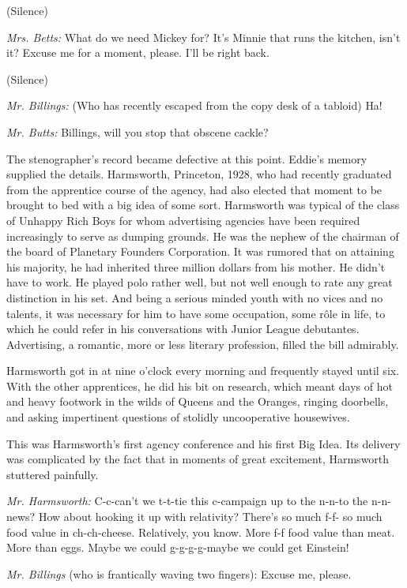\documentclass[nohyper,openany,nobib]{tufte-book}
\begin{document}
(Silence)

\emph{Mrs. Betts:} What do we need Mickey for? It's Minnie that runs the
kitchen, isn't it? Excuse me for a moment, please. I'll be right back.

(Silence)

\emph{Mr. Billings:} (Who has recently escaped from the copy desk of a
tabloid) Ha!

\emph{Mr. Butts:} Billings, will you stop that obscene cackle?

The stenographer's record became defective at this point. Eddie's memory
supplied the details. Harmsworth, Princeton, 1928, who had recently
graduated from the apprentice course of the agency, had also elected
that moment to be brought to bed with a big idea of some sort.
Harmsworth was typical of the class of Unhappy Rich Boys for whom
advertising agencies have been required increasingly to serve as dumping
grounds. He was the nephew of the chairman of the board of Planetary
Founders Corporation. It was rumored that on attaining his majority, he
had inherited three million dollars from his mother. He didn't have to
work. He played polo rather well, but not well enough to rate any great
distinction in his set. And being a serious minded youth with no vices
and no talents, it was necessary for him to have some occupation, some
r\^{o}le in life, to which he could refer in his conversations with Junior
League debutantes. Advertising, a romantic, more or less literary
profession, filled the bill admirably.

Harmsworth got in at nine o'clock every morning and frequently stayed
until six. With the other apprentices, he did his bit on research, which
meant days of hot and heavy footwork in the wilds of Queens and the
Oranges, ringing doorbells, and asking impertinent questions of stolidly
uncooperative housewives.

This was Harmsworth's first agency conference and his first Big Idea.
Its delivery was complicated by the fact that in moments of great
excitement, Harmsworth stuttered painfully.

\emph{Mr. Harmsworth:} C-c-can't we t-t-tie this c-campaign up to the
n-n-to the n-n-news? How about hooking it up with relativity? There's so
much f-f- so much food value in ch-ch-cheese. Relatively, you know. More
f-f food value than meat. More than eggs. Maybe we could g-g-g-g-maybe
we could get Einstein!

\emph{Mr. Billings} (who is frantically waving two fingers): Excuse me,
please.
\end{document}
